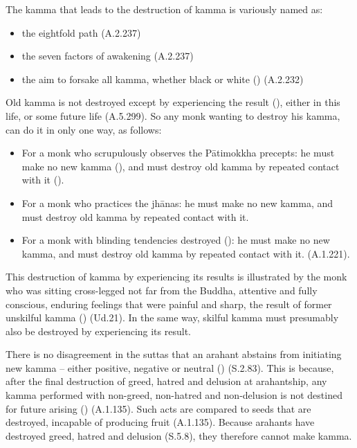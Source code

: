 The kamma that leads to the destruction of kamma is variously named as:

\begin{itemize}
\item the eightfold path (A.2.237)
\item the seven factors of awakening (A.2.237)
\item the aim to forsake all kamma, whether black or white () (A.2.232)
\end{itemize}

Old kamma is not destroyed except by experiencing the result (), either in this life, or some future life (A.5.299). So any monk wanting to destroy his kamma, can do it in only one way, as follows:

\begin{itemize}
\item For a monk who scrupulously observes the Pātimokkha precepts: he must make no new kamma (), and must destroy old kamma by repeated contact with it ().
\item For a monk who practices the jhānas: he must make no new kamma, and must destroy old kamma by repeated contact with it.
\item For a monk with blinding tendencies destroyed (): he must make no new kamma, and must destroy old kamma by repeated contact with it. (A.1.221).
\end{itemize}

This destruction of kamma by experiencing its results is illustrated by the monk who was sitting cross-legged not far from the Buddha, attentive and fully conscious, enduring feelings that were painful and sharp, the result of former unskilful kamma () (Ud.21). In the same way, skilful kamma must presumably also be destroyed by experiencing its result.

There is no disagreement in the suttas that an arahant abstains from initiating new kamma -- either positive, negative or neutral () (S.2.83). This is because, after the final destruction of greed, hatred and delusion at arahantship, any kamma performed with non-greed, non-hatred and non-delusion is not destined for future arising () (A.1.135). Such acts are compared to seeds that are destroyed, incapable of producing fruit (A.1.135). Because arahants have destroyed greed, hatred and delusion (S.5.8), they therefore cannot make kamma.


